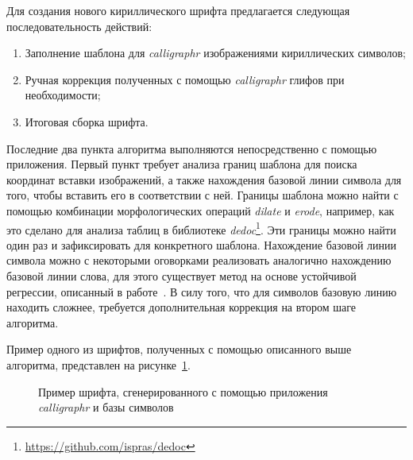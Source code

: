 Для создания нового кириллического шрифта предлагается следующая последовательность действий:
\begin{enumerate}
    \item Заполнение шаблона для \textit{calligraphr} изображениями кириллических символов;
    \item Ручная коррекция полученных с помощью \textit{calligraphr} глифов при необходимости;
    \item Итоговая сборка шрифта.
\end{enumerate}

Последние два пункта алгоритма выполняются непосредственно с помощью приложения.
Первый пункт требует анализа границ шаблона для поиска координат вставки изображений,
а также нахождения базовой линии символа для того, чтобы вставить его в соответствии с ней.
Границы шаблона можно найти с помощью комбинации морфологических операций \textit{dilate} и \textit{erode},
например, как это сделано для анализа таблиц в библиотеке \textit{dedoc}\footnote{\url{https://github.com/ispras/dedoc}}.
Эти границы можно найти один раз и зафиксировать для конкретного шаблона.
Нахождение базовой линии символа можно с некоторыми оговорками реализовать аналогично нахождению базовой линии слова,
для этого существует метод на основе устойчивой регрессии, описанный в работе~\cite{sueiras2021continuous}.
В силу того, что для символов базовую линию находить сложнее, требуется дополнительная коррекция на втором шаге алгоритма.

Пример одного из шрифтов, полученных с помощью описанного выше алгоритма, представлен на рисунке~\ref{fig:font_example}.

\begin{figure}[h!]
    \centering
    \caption{Пример шрифта, сгенерированного с помощью приложения \textit{calligraphr} и базы символов}
    \label{fig:font_example}
\end{figure}

